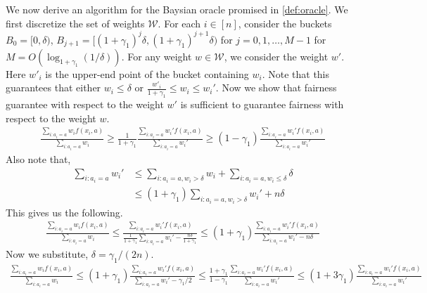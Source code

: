 \documentclass{article}
\newcommand{\WW}{\mathcal{W}}
\newcommand{\norm}[1]{\lVert #1 \rVert}
\begin{document}
We now derive an algorithm for the Baysian oracle promised in \ref{def:oracle}. 
We first discretize the set of weights $\WW$. For each $i \in [n]$, consider the buckets $B_0 = [0,\delta)$, $B_{j+1} = [(1+\gamma_1)^j \delta, (1+\gamma_1)^{j+1}\delta)$ for $j=0,1,\ldots,M-1$ for $M = O(\log_{1+\gamma_1}(1/\delta) )$. For any weight $w\in \WW$, we consider the weight $w'$. Here $w'_i$ is the upper-end point of the bucket containing $w_i$. Note that this guarantees that either $w_i\le \delta$ or $\frac{w'_i}{1+\gamma_1} \le w_i \le w_i'$. Now we show that  fairness guarantee with respect to the weight $w'$ is sufficient to guarantee fairness with respect to the weight $w$. 
%
\begin{align*}
\frac{\sum_{i: a_i = a} w_i f(x_i,a)}{\sum_{i: a_i = a} w_i} \ge \frac{1}{1+\gamma_1}  \frac{\sum_{i: a_i = a} w_i' f(x_i,a)}{\sum_{i: a_i = a} w_i'} \ge (1-\gamma_1) \frac{\sum_{i: a_i = a} w_i' f(x_i,a)}{\sum_{i: a_i = a} w_i'} 
\end{align*}
Also note that,
\begin{align*}
\sum_{i: a_i = a} w_i' &\le \sum_{i:a_i = a, w_i > \delta} w_i + \sum_{i: a_i = a, w_i \le \delta} \delta \\
&\le (1+\gamma_1) \sum_{i:a_i = a, w_i > \delta} w_i' + n \delta
\end{align*}
This gives us the following.
\begin{align*}
\frac{\sum_{i: a_i = a} w_i f(x_i,a)}{\sum_{i: a_i = a} w_i} \le \frac{\sum_{i: a_i = a} w_i' f(x_i,a)}{\frac{1}{1+\gamma_1}\sum_{i: a_i = a} w_i' - \frac{n\delta}{1+\gamma_1} }  \le (1+\gamma_1) \frac{\sum_{i: a_i = a} w_i' f(x_i,a)}{\sum_{i: a_i = a} w_i' - n\delta } 
\end{align*}
Now we substitute, $\delta=\gamma_1/(2n)$. 
\begin{align}
\frac{\sum_{i: a_i = a} w_i f(x_i,a)}{\sum_{i: a_i = a} w_i} \le (1+\gamma_1) \frac{\sum_{i: a_i = a} w_i' f(x_i,a)}{\sum_{i: a_i = a} w_i' - \gamma_1/2} \le \frac{1+\gamma_1}{1-\gamma_1} \frac{\sum_{i: a_i = a} w_i' f(x_i,a)}{\sum_{i: a_i = a} w_i'} \le (1+3\gamma_1)  \frac{\sum_{i: a_i = a} w_i' f(x_i,a)}{\sum_{i: a_i = a} w_i'}
\end{align}
\end{document}
